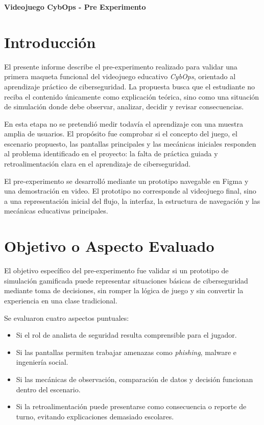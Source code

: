 ﻿\documentclass[12pt]{article}
\begin{document}
\onehalfspacing

\tableofcontents
\newpage

\begin{center}
    {\Large \textbf{Videojuego CybOps - Pre Experimento}}
\end{center}

\section{Introducci\'{o}n}

El presente informe describe el pre-experimento realizado para validar una primera maqueta funcional del videojuego educativo \textit{CybOps}, orientado al aprendizaje pr\'{a}ctico de ciberseguridad. La propuesta busca que el estudiante no reciba el contenido \'{u}nicamente como explicaci\'{o}n te\'{o}rica, sino como una situaci\'{o}n de simulaci\'{o}n donde debe observar, analizar, decidir y revisar consecuencias.

En esta etapa no se pretendi\'{o} medir todav\'{i}a el aprendizaje con una muestra amplia de usuarios. El prop\'{o}sito fue comprobar si el concepto del juego, el escenario propuesto, las pantallas principales y las mec\'{a}nicas iniciales responden al problema identificado en el proyecto: la falta de pr\'{a}ctica guiada y retroalimentaci\'{o}n clara en el aprendizaje de ciberseguridad.

El pre-experimento se desarroll\'{o} mediante un prototipo navegable en Figma y una demostraci\'{o}n en video. El prototipo no corresponde al videojuego final, sino a una representaci\'{o}n inicial del flujo, la interfaz, la estructura de navegaci\'{o}n y las mec\'{a}nicas educativas principales.

\section{Objetivo o Aspecto Evaluado}

El objetivo espec\'{i}fico del pre-experimento fue validar si un prototipo de simulaci\'{o}n gamificada puede representar situaciones b\'{a}sicas de ciberseguridad mediante toma de decisiones, sin romper la l\'{o}gica de juego y sin convertir la experiencia en una clase tradicional.

Se evaluaron cuatro aspectos puntuales:

\begin{itemize}
    \item Si el rol de analista de seguridad resulta comprensible para el jugador.
    \item Si las pantallas permiten trabajar amenazas como \textit{phishing}, malware e ingenier\'{i}a social.
    \item Si las mec\'{a}nicas de observaci\'{o}n, comparaci\'{o}n de datos y decisi\'{o}n funcionan dentro del escenario.
    \item Si la retroalimentaci\'{o}n puede presentarse como consecuencia o reporte de turno, evitando explicaciones demasiado escolares.
\end{itemize}
\end{document}
